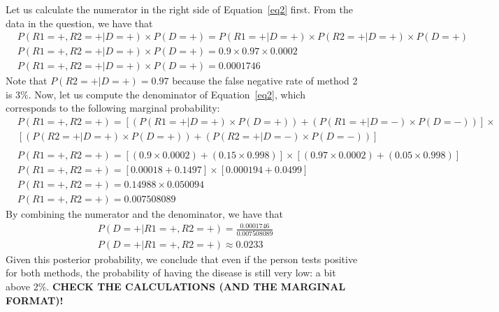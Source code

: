 \documentclass[leqno]{article}
\begin{document}
\noindent Let us calculate the numerator in the right side of Equation~\ref{eq2} first. From
the data in the question, we have that
\begin{equation*}
\begin{split}
&P(R1 = +, R2 = +| D = +) \times P(D = +) = P(R1 = +|D = +) \times P(R2 = +| D = +) \times P(D = +)
\\
&P(R1 = +, R2 = +| D = +) \times P(D = +) = 0.9 \times 0.97 \times 0.0002
\\
&P(R1 = +, R2 = +| D = +) \times P(D = +) = 0.0001746
\end{split}  
\end{equation*}  
Note that $P(R2 = +| D = +) = 0.97$ because the false negative rate of method 2 is 3\%. Now, let us
compute the denominator of Equation~\ref{eq2}, which corresponds to the following marginal
probability:
\begin{equation*}
\begin{split}
&P(R1 = +, R2 = +) = [(P(R1 = +|D = +) \times P(D = +)) + (P(R1 = +|D = -) \times P(D = -))] \times
\\
&[(P(R2 = +|D = +) \times P(D = +)) + (P(R2 = +|D = -) \times P(D = -))]
\\
\\
&P(R1 = +, R2 = +) = [(0.9 \times 0.0002) + (0.15 \times 0.998)] \times [(0.97 \times 0.0002) + (0.05 \times 0.998)]
\\
&P(R1 = +, R2 = +) = [0.00018 + 0.1497] \times [0.000194 + 0.0499]
\\
&P(R1 = +, R2 = +) = 0.14988 \times 0.050094
\\
&P(R1 = +, R2 = +) = 0.007508089
\end{split}  
\end{equation*}
By combining the numerator and the denominator, we have that
\begin{equation*}
\begin{split}
&P(D = +| R1 = +, R2 = +) = \frac{0.0001746}{0.007508089}
\\
&P(D = +| R1 = +, R2 = +) \approx 0.0233
\end{split}  
\end{equation*}
Given this posterior probability, we conclude that even if the person tests positive for both methods, the probability of having the
disease is still very low: a bit above 2\%. \textbf{CHECK THE CALCULATIONS (AND THE MARGINAL FORMAT)!}
\end{document}
